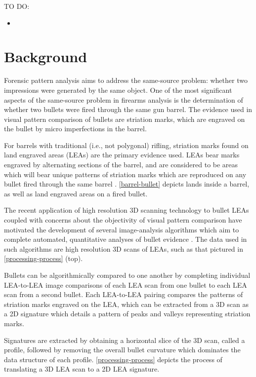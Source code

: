 \documentclass[12pt]{article}
\providecommand{\tightlist}{%
  \setlength{\itemsep}{0pt}\setlength{\parskip}{0pt}}
\begin{document}
TO DO:

\begin{itemize}
\tightlist
\item
\end{itemize}

\section{Background}

Forensic pattern analysis aims to address the same-source problem:
whether two impressions were generated by the same object. One of the
most significant aspects of the same-source problem in firearms analysis
is the determination of whether two bullets were fired through the same
gun barrel. The evidence used in visual pattern comparison of bullets
are striation marks, which are engraved on the bullet by micro
imperfections in the barrel.

For barrels with traditional (i.e., not polygonal) rifling, striation
marks found on land engraved areas (LEAs) are the primary evidence used.
LEAs bear marks engraved by alternating sections of the barrel, and are
considered to be areas which will bear unique patterns of striation
marks which are reproduced on any bullet fired through the same barrel
\cite{AFTE}. \autoref{barrel-bullet} depicts lands inside a barrel, as
well as land engraved areas on a fired bullet.

The recent application of high resolution 3D scanning technology to
bullet LEAs coupled with concerns about the objectivity of visual
pattern comparison have motivated the development of several
image-analysis algorithms which aim to complete automated, quantitative
analyses of bullet evidence
\citep[see][]{DeKinder1, DeKinder2, Bachrach1, Ma1, Chu1, Chu2, Hare1}.
The data used in such algorithms are high resolution 3D scans of LEAs,
such as that pictured in \autoref{processing-process} (top).

Bullets can be algorithmically compared to one another by completing
individual LEA-to-LEA image comparisons of each LEA scan from one bullet
to each LEA scan from a second bullet. Each LEA-to-LEA pairing compares
the patterns of striation marks engraved on the LEA, which can be
extracted from a 3D scan as a 2D signature which details a pattern of
peaks and valleys representing striation marks.

Signatures are extracted by obtaining a horizontal slice of the 3D scan,
called a profile, followed by removing the overall bullet curvature
which dominates the data structure of each profile.
\autoref{processing-process} depicts the process of translating a 3D LEA
scan to a 2D LEA signature.
\end{document}
